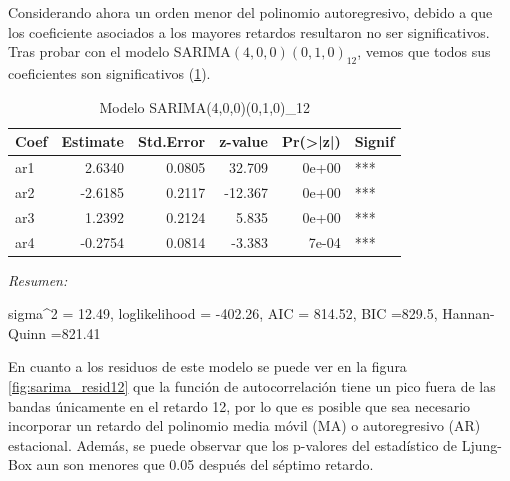 \documentclass[12pt,oneside]{book}\usepackage[]{graphicx}\usepackage[]{color}
\newenvironment{knitrout}{}{} %
\theoremstyle{definition} %
\begin{document}


Considerando ahora un orden menor del polinomio autoregresivo, debido a que los coeficiente asociados a los mayores retardos resultaron no ser significativos. Tras probar con el modelo SARIMA$(4,0,0)(0,1,0)_{12}$, vemos que todos sus coeficientes son significativos (\ref{mod:sarima_resid12}).


\begin{knitrout}
\color{fgcolor}\begin{table}

\caption{\label{tab:unnamed-chunk-15}\label{mod:sarima_resid12}Modelo SARIMA(4,0,0)(0,1,0)_{12}}
\centering
\begin{threeparttable}
\begin{tabular}[t]{lrrrrl}
\toprule
Coef & Estimate & Std.Error & z-value & Pr(>|z|) & Signif\\
\midrule
\rowcolor{gray!6}  ar1 & 2.6340 & 0.0805 & 32.709 & 0e+00 & ***\\
ar2 & -2.6185 & 0.2117 & -12.367 & 0e+00 & ***\\
\rowcolor{gray!6}  ar3 & 1.2392 & 0.2124 & 5.835 & 0e+00 & ***\\
ar4 & -0.2754 & 0.0814 & -3.383 & 7e-04 & ***\\
\bottomrule
\end{tabular}
\begin{tablenotes}
\item \textit{Resumen:} 
\item sigma\textasciicircum{}2 = 12.49, loglikelihood = -402.26, AIC = 814.52, BIC =829.5, Hannan-Quinn =821.41
\end{tablenotes}
\end{threeparttable}
\end{table}


\end{knitrout}


En cuanto a los residuos de este modelo se puede ver en la figura \ref{fig:sarima_resid12} que la función de autocorrelación tiene un pico fuera de las bandas únicamente en el retardo 12, por lo que es posible que sea necesario incorporar un retardo del polinomio media móvil (MA) o autoregresivo (AR) estacional. Además, se puede observar que los p-valores del estadístico de Ljung-Box aun son menores que 0.05 después del séptimo retardo.
\end{document}
